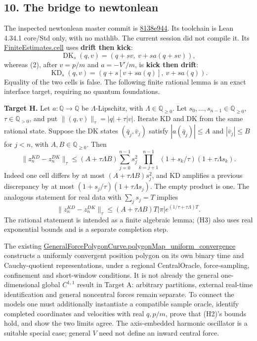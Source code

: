 \documentclass[11pt,a4paper]{article}
\begin{document}
\hypertarget{the-bridge-to-newtonlean}{%
\subsection{10. The bridge to
newtonlean}\label{the-bridge-to-newtonlean}}

The inspected newtonlean master commit is
\href{https://github.com/arivero/newtonlean/commit/8138e9449b4f961c4adbebcb6090acc0d2fd5aaf}{8138e944}.
Its toolchain is Lean 4.34.1 core/Std only, with no mathlib. The current
session did not compile it. Its
\href{https://github.com/arivero/newtonlean/blob/8138e9449b4f961c4adbebcb6090acc0d2fd5aaf/BarrowLib/Polygon/FiniteEstimates.lean}{FiniteEstimates.cell}
uses \textbf{drift then kick}:
\[\operatorname{DK}_s(q,v)=(q+sv,\ v+sa(q+sv)), \tag{H0}\] whereas (2),
after \(v=p/m\) and \(a=-V'/m\), is \textbf{kick then drift}:
\[\operatorname{KD}_s(q,v)=(q+s[v+sa(q)],\ v+sa(q)). \tag{H1}\] Equality
of the two cells is false. The following finite rational lemma is an
exact interface target, requiring no quantum foundations.

\textbf{Target H.} Let \(a:\mathbb Q\to\mathbb Q\) be
\(\Lambda\)-Lipschitz, with \(\Lambda\in\mathbb Q_{\ge0}\). Let
\(s_0,\ldots,s_{n-1}\in\mathbb Q_{\ge0}\), \(\tau\in\mathbb Q_{>0}\),
and put \(\|(q,v)\|_\tau=|q|+\tau|v|\). Iterate KD and DK from the same
rational state. Suppose the DK states \((\bar q_j,\bar v_j)\) satisfy
\(|a(\bar q_j)|\le A\) and \(|\bar v_j|\le B\) for \(j<n\), with
\(A,B\in\mathbb Q_{\ge0}\). Then \[
 \|z_n^{KD}-z_n^{DK}\|_\tau
 \le(A+\tau\Lambda B)
 \sum_{j=0}^{n-1}s_j^2
  \prod_{k=j+1}^{n-1}(1+s_k/\tau)(1+\tau\Lambda s_k). \tag{H2}
\] Indeed one cell differs by at most \((A+\tau\Lambda B)s_j^2\), and KD
amplifies a previous discrepancy by at most
\((1+s_j/\tau)(1+\tau\Lambda s_j)\). The empty product is one. The
analogous statement for real data with \(\sum_js_j=T\) implies
\[\|z_n^{KD}-z_n^{DK}\|_\tau
 \le(A+\tau\Lambda B)T|\pi|e^{(1/\tau+\tau\Lambda)T}. \tag{H3}\] The
rational statement is intended as a finite algebraic lemma; (H3) also
uses real exponential bounds and is a separate completion step.

The existing
\href{https://github.com/arivero/newtonlean/blob/8138e9449b4f961c4adbebcb6090acc0d2fd5aaf/ModernLib/Polygon/GeneralForcePolygonCurve.lean}{GeneralForcePolygonCurve.polygonMap\_uniform\_convergence}
constructs a uniformly convergent position polygon on its own binary
time and Cauchy-quotient representations, under a regional
CentralOracle, force-sampling, confinement and short-window conditions.
It is not already the general one-dimensional global \(C^{1,1}\) result
in Target A: arbitrary partitions, external real-time identification and
general noncentral forces remain separate. To connect the models one
must additionally instantiate a compatible sample oracle, identify
completed coordinates and velocities with real \(q,p/m\), prove that
(H2)'s bounds hold, and show the two limits agree. The axis-embedded
harmonic oscillator is a suitable special case; general \(V\) need not
define an inward central force.
\end{document}
